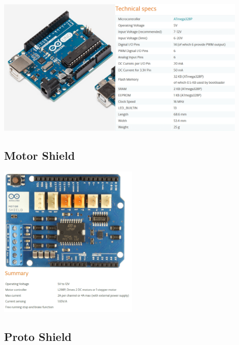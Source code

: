 \documentclass[11pt]{article}
\begin{document}
\begin{appendices}
\begin{center}
\includegraphics[width=0.9\textwidth]{images/arduinoSpecs.png}
\label{figure:arduinoSpecs}
\end{center}

\subsection{Motor Shield}
\label{appendix:motorShield}

\begin{center}
\includegraphics[width=0.5\textwidth]{images/motorShield.png}
\label{figure:motorShield}
\end{center}

\subsection{Proto Shield}
\label{appendix:protoShield}


\end{appendices}
\end{document}
